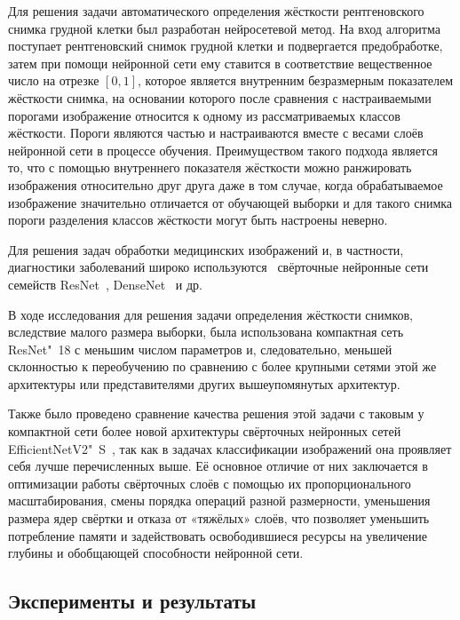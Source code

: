 Для решения задачи автоматического определения жёсткости рентгеновского снимка грудной клетки был разработан нейросетевой метод. На вход алгоритма поступает рентгеновский снимок грудной клетки и подвергается предобработке, затем при помощи нейронной сети ему ставится в соответствие вещественное число на отрезке $\left[0, 1\right]$, которое является внутренним безразмерным показателем жёсткости снимка, на основании которого после сравнения с настраиваемыми порогами изображение относится к одному из рассматриваемых классов жёсткости.  Пороги являются частью  и настраиваются вместе с весами слоёв нейронной сети в процессе обучения. Преимуществом такого подхода является то, что с помощью внутреннего показателя жёсткости можно ранжировать изображения относительно друг друга даже в том случае, когда обрабатываемое изображение значительно отличается от обучающей выборки и для такого снимка пороги разделения классов жёсткости могут быть настроены неверно.

Для решения задач обработки медицинских изображений и, в частности, диагностики заболеваний широко используются~\cite{oloko2022systematic} свёрточные нейронные сети семейств ResNet~\cite{he2016deep}, DenseNet~\cite{huang2017densely} и др.

В ходе исследования для решения задачи определения жёсткости снимков, вследствие малого размера выборки, была использована компактная сеть ResNet"~18 с меньшим числом параметров и, следовательно, меньшей склонностью к переобучению по сравнению с более крупными сетями этой же архитектуры или представителями других вышеупомянутых архитектур.

Также было проведено сравнение качества решения этой задачи с таковым у компактной сети более новой архитектуры свёрточных нейронных сетей EfficientNetV2"~S~\cite{tan2021efficientnetv2}, так как в задачах классификации изображений она проявляет себя лучше перечисленных выше. Её основное отличие от них заключается в оптимизации работы свёрточных слоёв с помощью их пропорционального масштабирования, смены порядка операций разной размерности, уменьшения размера ядер свёртки и отказа от «тяжёлых» слоёв, что позволяет уменьшить потребление памяти и задействовать освободившиеся ресурсы на увеличение глубины и обобщающей способности нейронной сети.

\subsection{Эксперименты и результаты} \label{subsec:tb-hardness-experiments}

